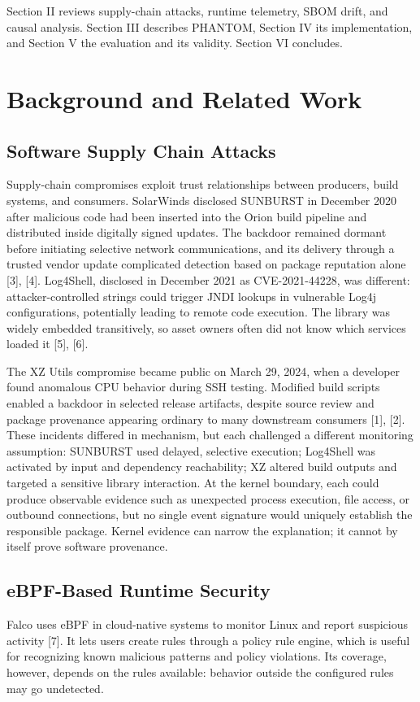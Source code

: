 \documentclass[conference]{IEEEtran}
\begin{document}
Section II reviews supply-chain attacks, runtime telemetry, SBOM drift, and causal analysis. Section III describes PHANTOM, Section IV its implementation, and Section V the evaluation and its validity. Section VI concludes.

\section{Background and Related Work}
\subsection{Software Supply Chain Attacks}
Supply-chain compromises exploit trust relationships between producers, build systems, and consumers. SolarWinds disclosed SUNBURST in December 2020 after malicious code had been inserted into the Orion build pipeline and distributed inside digitally signed updates. The backdoor remained dormant before initiating selective network communications, and its delivery through a trusted vendor update complicated detection based on package reputation alone [3], [4]. Log4Shell, disclosed in December 2021 as CVE-2021-44228, was different: attacker-controlled strings could trigger JNDI lookups in vulnerable Log4j configurations, potentially leading to remote code execution. The library was widely embedded transitively, so asset owners often did not know which services loaded it [5], [6].

The XZ Utils compromise became public on March 29, 2024, when a developer found anomalous CPU behavior during SSH testing. Modified build scripts enabled a backdoor in selected release artifacts, despite source review and package provenance appearing ordinary to many downstream consumers [1], [2]. These incidents differed in mechanism, but each challenged a different monitoring assumption: SUNBURST used delayed, selective execution; Log4Shell was activated by input and dependency reachability; XZ altered build outputs and targeted a sensitive library interaction. At the kernel boundary, each could produce observable evidence such as unexpected process execution, file access, or outbound connections, but no single event signature would uniquely establish the responsible package. Kernel evidence can narrow the explanation; it cannot by itself prove software provenance.

\subsection{eBPF-Based Runtime Security}
Falco uses eBPF in cloud-native systems to monitor Linux and report suspicious activity [7]. It lets users create rules through a policy rule engine, which is useful for recognizing known malicious patterns and policy violations. Its coverage, however, depends on the rules available: behavior outside the configured rules may go undetected.
\end{document}
